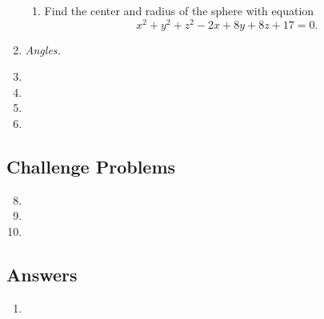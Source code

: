\begin{enumerate}
\begin{enumerate}
\item Find the center and radius of the sphere with equation
\begin{equation*}
x^2 + y^2 + z^2 - 2x + 8y + 8z + 17 = 0.
\end{equation*}
\end{enumerate}
\item \emph{Angles.} %
\item %
\item %
\item %
\item %
\end{enumerate}


\newpage
\subsection{Challenge Problems}

\begin{enumerate}\setcounter{enumi}{7}
\item %
\item %
\item %
\end{enumerate}


\newpage
\subsection{Answers}

\begin{enumerate}
\item 
\end{enumerate}